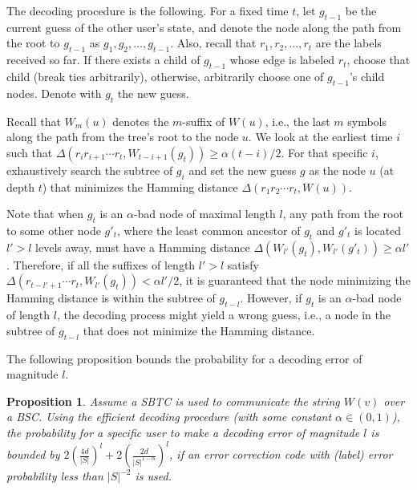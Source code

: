 \documentclass[ letterpaper, 11pt]{article}
\newtheorem{proposition}[theorem]{Proposition}
\newcommand{\KTC}{\textsf{SBTC}\xspace}
\begin{document}
The decoding procedure is the following.
For a fixed time $t$, let $g_{t-1}$ be the current guess of the other user's state,
and denote the node along the path from the root to $g_{t-1}$ as $g_1, g_2, \ldots, g_{t-1}$.
Also, recall that  $r_1,r_2, \ldots, r_t$ are the labels received so far. If there exists a child of $g_{t-1}$
whose edge is labeled $r_t$, choose that child (break ties arbitrarily),
otherwise, arbitrarily choose one of $g_{t-1}$'s child nodes.
Denote with $g_t$ the new guess.

Recall that $W_m(u)$ denotes the $m$-suffix of $W(u)$, i.e., the last $m$ symbols along the path from the tree's root to the node $u$.
We look at the earliest time $i$ such that $\Delta( r_ir_{i+1}\cdots r_t, W_{t-i+1}(g_t)) \ge \alpha (t-i)/2$.
For that specific $i$, exhaustively search the subtree of $g_i$ and set
the new guess $g$ as the node $u$
(at depth $t$) that minimizes the Hamming distance $\Delta(r_1r_2\cdots r_t, W(u))$.


Note that when $g_t$ is an $\alpha$-bad node of maximal length $l$,
any path from the root to some other node $g'_t$,
where the least common ancestor of $g_t$ and $g'_t$ is located $l'>l$ levels away,
must have
a Hamming distance $\Delta(W_{l'}(g_t) , W_{l'}(g'_t)) \ge \alpha l'$.
Therefore, if all the suffixes of length $l'>l$ satisfy
$\Delta( r_{t-l'+1}\cdots r_t, W_{l'}(g_t)) < \alpha l'/2$,
it is guaranteed that the
node minimizing the Hamming distance is within the subtree of $g_{t-l}$.
However, if $g_t$ is an $\alpha$-bad node of length $l$,
the decoding process might yield a wrong guess,
i.e., a node in the subtree of $g_{t-l}$ that does not minimize the Hamming distance.

The following proposition bounds the probability for a decoding error of magnitude $l$.
\begin{proposition}\label{pro:errorProb}
Assume a \KTC is used to communicate the string $W(v)$ over a BSC.
Using the efficient decoding procedure (with some constant $\alpha\in(0,1)$),
the probability for a specific user to make
a decoding error of magnitude $l$
is  bounded by $2\left(\frac{4d}{|S|}\right)^l + 2\left(\frac{2d}{|S|^{1-\alpha}}\right)^l$,
if an error correction code with (label)
error probability less than $|S|^{-2}$ is used.
\end{proposition}
\end{document}
